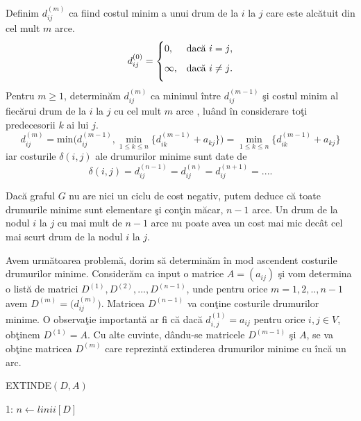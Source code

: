 \documentclass[11pt,a4paper]{report}
\begin{document}
     Definim $d_{ij}^{(m)}$ ca fiind costul minim a unui drum de la $i$ la $j$ care este alc\u atuit din cel mult $m$ arce.
     \begin{equation*}
		d_{ij}^{(0)}=
		\begin{cases}
		0,&\text{dac\u a $i=j$}, \medskip\\
		\infty,&\text{dac\u a $i\ne j$}.\medskip
		\end{cases}
	 \end{equation*}
	 Pentru $m\geq 1$, determin\u am $d_{ij}^{(m)}$ ca minimul \^ intre $d_{ij}^{(m-1)}$ \c si costul minim al fiec\u arui drum de la $i$ la $j$ cu cel mult $m$ arce , lu\^ and \^ in considerare to\c ti predecesorii $k$ ai lui $j$.
	 \begin{equation}
	 d_{ij}^{(m)}=\text{min} \bigg( d_{ij}^{(m-1)},\min_{1\leq k \leq n} \bigg\{  d_{ik}^{(m-1)}+a_{kj}\bigg\} \bigg) = \min_{1\leq k \leq n}\bigg\{  d_{ik}^{(m-1)}+a_{kj}\bigg\}
	 \end{equation}
     iar costurile $\delta (i,j)$ ale drumurilor minime sunt date de 
          \begin{equation*}
     \delta (i,j)=d_{ij}^{(n-1)}=d_{ij}^{(n)}=d_{ij}^{(n+1)}=....
     \end{equation*}
     
     Dac\u a graful $G$ nu are nici un ciclu de cost negativ, putem deduce c\u a toate drumurile minime sunt elementare \c si con\c tin m\u acar, $n-1$ arce. Un drum de la nodul $i$ la  $j$ cu mai mult de $n-1$ arce nu poate avea un cost mai mic dec\^ at cel mai scurt drum de la nodul $i$ la $j$.
     
     Avem urm\u atoarea problem\u a, dorim s\u a determin\u am \^ in mod ascendent costurile drumurilor minime. Consider\u am ca input o matrice $A=(a_{ij})$ \c si vom determina o list\u a de matrici $D^{(1)},D^{(2)},...,D^{(n-1)}$, unde pentru orice $m=1,2,..,n-1$ avem $D^{(m)}=\big( d_{ij}^{(m)} \big)$. Matricea $D^{(n-1)}$ va con\c tine costurile drumurilor minime. O observa\c tie important\u a ar fi c\u a dac\u a $d_{i,j}^{(1)}=a_{ij}$ pentru orice $i,j\in V$, ob\c tinem $D^{(1)}=A$. Cu alte cuvinte, d\^ andu-se matricele $D^{(m-1)}$ \c si $A$, se va ob\c tine matricea $D^{(m)}$ care reprezint\u a extinderea drumurilor minime cu \^ inc\u a un arc.
     
     \vspace{0.3cm}
     EXTINDE$(D,A)$
     
     \vspace{0.1cm}
     1: $n\leftarrow linii[D]$
     
\end{document}
